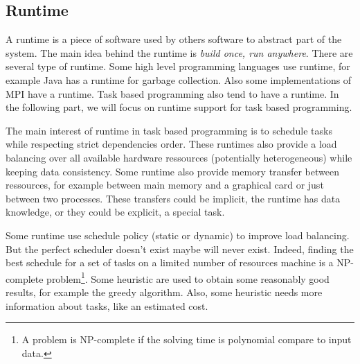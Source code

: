 \subsection{Runtime}
A runtime is a piece of software used by others software to abstract part of the system.
%
The main idea behind the runtime is {\em build once, run anywhere}.
%
There are several type of runtime.
%
Some high level programming languages use runtime, for example Java has a runtime for garbage collection.
%
Also some implementations of MPI have a runtime.
%
Task based programming also tend to have a runtime.
%
In the following part, we will focus on runtime support for task based programming.



The main interest of runtime in task based programming is to schedule tasks while respecting strict dependencies order.
%
These runtimes also provide a load balancing over all available hardware ressources (potentially heterogeneous) while keeping data consistency.
%
Some runtime also provide memory transfer between ressources, for example between main memory and a graphical card or just between two processes.
%
These transfers could be implicit, the runtime has data knowledge, or they could be explicit, a special task.


Some runtime use schedule policy (static or dynamic) to improve load balancing.
%
But the perfect scheduler doesn't exist maybe will never exist.
%
Indeed, finding the best schedule for a set of tasks on a limited number of resources machine is a NP-complete problem\footnote{A problem is NP-complete if the solving time is polynomial compare to input data.}.
%
Some heuristic are used to obtain some reasonably good results, for example the greedy algorithm.
%
Also, some heuristic needs more information about tasks, like an estimated cost.
